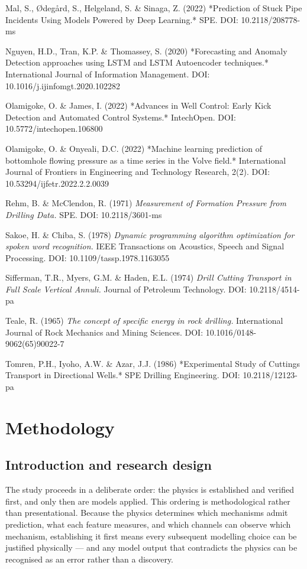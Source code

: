 \documentclass[12pt,a4paper]{report}
\begin{document}
Mal, S., Ødegård, S., Helgeland, S. \& Sinaga, Z. (2022) *Prediction of Stuck Pipe Incidents Using Models
Powered by Deep Learning.* SPE. DOI: 10.2118/208778-ms

Nguyen, H.D., Tran, K.P. \& Thomassey, S. (2020) *Forecasting and Anomaly Detection approaches using LSTM
and LSTM Autoencoder techniques.* International Journal of Information Management. DOI:
10.1016/j.ijinfomgt.2020.102282

Olamigoke, O. \& James, I. (2022) *Advances in Well Control: Early Kick Detection and Automated Control
Systems.* IntechOpen. DOI: 10.5772/intechopen.106800

Olamigoke, O. \& Onyeali, D.C. (2022) *Machine learning prediction of bottomhole flowing pressure as a time
series in the Volve field.* International Journal of Frontiers in Engineering and Technology Research,
2(2). DOI: 10.53294/ijfetr.2022.2.2.0039

Rehm, B. \& McClendon, R. (1971) \emph{Measurement of Formation Pressure from Drilling Data.} SPE. DOI:
10.2118/3601-ms

Sakoe, H. \& Chiba, S. (1978) \emph{Dynamic programming algorithm optimization for spoken word recognition.}
IEEE Transactions on Acoustics, Speech and Signal Processing. DOI: 10.1109/tassp.1978.1163055

Sifferman, T.R., Myers, G.M. \& Haden, E.L. (1974) \emph{Drill Cutting Transport in Full Scale Vertical Annuli.}
Journal of Petroleum Technology. DOI: 10.2118/4514-pa

Teale, R. (1965) \emph{The concept of specific energy in rock drilling.} International Journal of Rock
Mechanics and Mining Sciences. DOI: 10.1016/0148-9062(65)90022-7

Tomren, P.H., Iyoho, A.W. \& Azar, J.J. (1986) *Experimental Study of Cuttings Transport in Directional
Wells.* SPE Drilling Engineering. DOI: 10.2118/12123-pa


\chapter{Methodology}

\section{Introduction and research design}

The study proceeds in a deliberate order: the physics is established and verified first, and only then are
models applied. This ordering is methodological rather than presentational. Because the physics determines
which mechanisms admit prediction, what each feature measures, and which channels can observe which
mechanism, establishing it first means every subsequent modelling choice can be justified physically ---
and any model output that contradicts the physics can be recognised as an error rather than a discovery.
\end{document}
